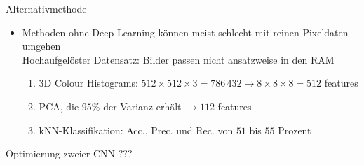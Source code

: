 \documentclass[aspectratio=1610, 9pt]{beamer}
\begin{document}
\begin{frame}{Alternativmethode}

  \begin{itemize}
    \item Methoden ohne Deep-Learning können meist schlecht mit reinen Pixeldaten umgehen\\
    \rightarrow{} Hochaufgelöster Datensatz: Bilder passen nicht ansatzweise in den RAM
    \begin{enumerate}
      \item 3D Colour Histograms: $512\times512\times3=786\,432 \to 8\times8\times8=512$ features
      \item PCA, die $95\%$ der Varianz erhält $\to 112$ features
      \item kNN-Klassifikation: Acc., Prec. und Rec. von $51$ bis $55$ Prozent
    \end{enumerate}
  \end{itemize}

  \begin{figure}
	   \centering
	   \hspace{1cm}
  \end{figure}

\end{frame}

\begin{frame}{Optimierung zweier CNN}
  ???
\end{frame}
\end{document}
